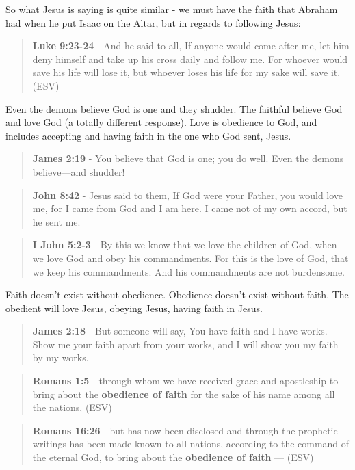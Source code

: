 \documentclass[11pt]{article}
\begin{document}
So what Jesus is saying is quite similar - we must have the faith that Abraham had when he put Isaac on the Altar, but in regards to following Jesus:

\begin{quote}
\textbf{Luke 9:23-24} - And he said to all, If anyone would come after me, let him deny himself and take up his cross daily and follow me. For whoever would save his life will lose it, but whoever loses his life for my sake will save it. (ESV)
\end{quote}

Even the demons believe God is one and they shudder. The faithful believe God and love God (a totally different response). Love is obedience to God, and includes accepting and having faith in the one who God sent, Jesus.

\begin{quote}
\textbf{James 2:19} - You believe that God is one; you do well. Even the demons believe—and shudder!
\end{quote}

\begin{quote}
\textbf{John 8:42} - Jesus said to them, If God were your Father, you would love me, for I came from God and I am here. I came not of my own accord, but he sent me.
\end{quote}

\begin{quote}
\textbf{I John 5:2-3} - By this we know that we love the children of God, when we love God and obey his commandments. For this is the love of God, that we keep his commandments. And his commandments are not burdensome.
\end{quote}

Faith doesn't exist without obedience. Obedience doesn't exist without faith. The obedient will love Jesus, obeying Jesus, having faith in Jesus.

\begin{quote}
\textbf{James 2:18} - But someone will say, You have faith and I have works. Show me your faith apart from your works, and I will show you my faith by my works.
\end{quote}

\begin{quote}
\textbf{Romans 1:5} - through whom we have received grace and apostleship to bring about the \textbf{obedience of faith} for the sake of his name among all the nations, (ESV)
\end{quote}

\begin{quote}
\textbf{Romans 16:26} - but has now been disclosed and through the prophetic writings has been made known to all nations, according to the command of the eternal God, to bring about the \textbf{obedience of faith} — (ESV)
\end{quote}
\end{document}
